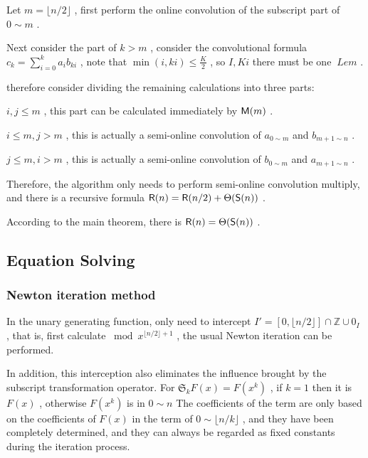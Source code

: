 \begin { enumerate }
\item Let $ m = \lfloor n/ 2 \rfloor $ , first perform the online convolution of the subscript part of $ 0 \sim m $ .
\item Next consider the part of $ k> m $ , consider the convolutional formula $ c_k = \sum _{i=0}^k a_ib_{ki} $ , note that $ \min (i,ki) \le  \frac K 2 $ , so $ I, Ki $ there must be one $ \ Le m $ .
\item therefore consider dividing the remaining calculations into three parts:
\begin { itemize }
\item  $ i,j \le m $ , this part can be calculated immediately by $  \mathsf M (m) $ .
\item  $ i \le m,j>m $ , this is actually a semi-online convolution of $ a_{0 \sim m} $ and $ b_{m+1 \sim n} $ .
\item  $ j \le m,i>m $ , this is actually a semi-online convolution of $ b_{0 \sim m} $ and $ a_{m+1 \sim n} $ .
\end { itemize }
\item Therefore, the algorithm only needs to perform semi-online convolution multiply, and there is a recursive formula $  \mathsf R (n) =  \mathsf R (n/ 2 ) + \Theta ( \mathsf S(n)) $ .
\item According to the main theorem, there is $  \mathsf R (n)= \Theta ( \mathsf S(n)) $ .
\end { enumerate }

\subsection { Equation Solving }

\subsubsection { Newton iteration method }

In the unary generating function, only need to intercept $ I'= [ 0 , \lfloor n/ 2 \rfloor ] \cap  \mathbb Z \cup  0 _I $ , that is, first calculate $ \bmod x^{ \lfloor n/2 \rfloor +1} $ , the usual Newton iteration can be performed.

In addition, this interception also eliminates the influence brought by the subscript transformation operator. For $ \mathfrak S_k F(x) = F(x^k) $ , if $ k = 1 $ then it is $ F(x) $ , otherwise $ F(x^k) $ is in $ 0 \sim n $ The coefficients of the term are only based on the coefficients of $ F(x) $ in the term of $ 0  \sim  \lfloor n/k \rfloor $ , and they have been completely determined, and they can always be regarded as fixed constants during the iteration process.

